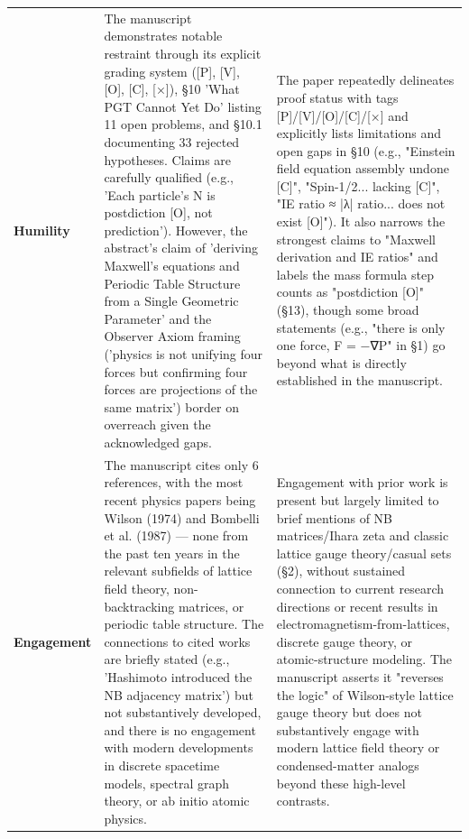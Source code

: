 \documentclass[11pt]{article}
\begin{document}
\begin{longtable}{@{} p{2.2cm} p{6.3cm} p{6.3cm} @{}}
\rowcolor{rowgray}
\textbf{Humility} &
The manuscript demonstrates notable restraint through its explicit grading system ([P], [V], [O], [C], [×]), §10 'What PGT Cannot Yet Do' listing 11 open problems, and §10.1 documenting 33 rejected hypotheses. Claims are carefully qualified (e.g., 'Each particle's N is postdiction [O], not prediction'). However, the abstract's claim of 'deriving Maxwell's equations and Periodic Table Structure from a Single Geometric Parameter' and the Observer Axiom framing ('physics is not unifying four forces but confirming four forces are projections of the same matrix') border on overreach given the acknowledged gaps. &
The paper repeatedly delineates proof status with tags [P]/[V]/[O]/[C]/[×] and explicitly lists limitations and open gaps in §10 (e.g., "Einstein field equation assembly undone [C]", "Spin-1/2... lacking [C]", "IE ratio ≈ |λ| ratio... does not exist [O]"). It also narrows the strongest claims to "Maxwell derivation and IE ratios" and labels the mass formula step counts as "postdiction [O]" (§13), though some broad statements (e.g., "there is only one force, F = −∇P" in §1) go beyond what is directly established in the manuscript. \\[6pt]

\textbf{Engagement} &
The manuscript cites only 6 references, with the most recent physics papers being Wilson (1974) and Bombelli et al. (1987) — none from the past ten years in the relevant subfields of lattice field theory, non-backtracking matrices, or periodic table structure. The connections to cited works are briefly stated (e.g., 'Hashimoto introduced the NB adjacency matrix') but not substantively developed, and there is no engagement with modern developments in discrete spacetime models, spectral graph theory, or ab initio atomic physics. &
Engagement with prior work is present but largely limited to brief mentions of NB matrices/Ihara zeta and classic lattice gauge theory/casual sets (§2), without sustained connection to current research directions or recent results in electromagnetism-from-lattices, discrete gauge theory, or atomic-structure modeling. The manuscript asserts it "reverses the logic" of Wilson-style lattice gauge theory but does not substantively engage with modern lattice field theory or condensed-matter analogs beyond these high-level contrasts. \\[6pt]


\end{longtable}
\end{document}
